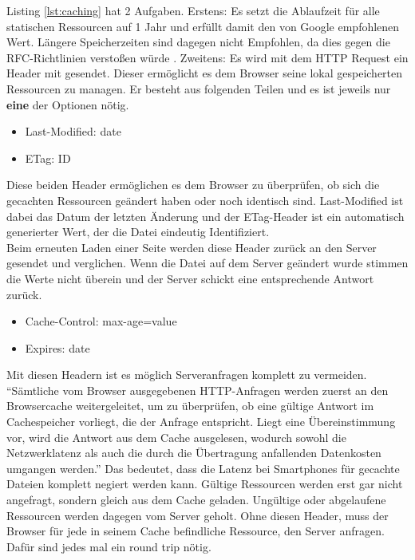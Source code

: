 			  Listing \ref{lst:caching} hat 2 Aufgaben. Erstens: Es setzt die Ablaufzeit für alle statischen Ressourcen auf 1 Jahr und erfüllt damit den von Google empfohlenen Wert. Längere Speicherzeiten sind dagegen nicht Empfohlen, da dies gegen die RFC-Richtlinien verstoßen würde \autocite{google14Caching}. Zweitens: Es wird mit dem HTTP Request ein Header mit gesendet. Dieser ermöglicht es dem Browser seine lokal gespeicherten Ressourcen zu managen. Er besteht aus folgenden Teilen und es ist jeweils nur \textbf{eine} der Optionen nötig.

			  \begin{itemize}
			  	\item Last-Modified: date
			  	\item ETag: ID
			  \end{itemize}

			  Diese beiden Header ermöglichen es dem Browser zu überprüfen, ob sich die gecachten Ressourcen geändert haben oder noch identisch sind. Last-Modified ist dabei das Datum der letzten Änderung und der ETag-Header ist ein automatisch generierter Wert, der die Datei eindeutig Identifiziert.\\
			  Beim erneuten Laden einer Seite werden diese Header zurück an den Server gesendet und verglichen. Wenn die Datei auf dem Server geändert wurde stimmen die Werte nicht überein und der Server schickt eine entsprechende Antwort zurück.

			  \begin{itemize}
			  	\item Cache-Control: max-age=value
			  	\item Expires: date
			  \end{itemize}

			  Mit diesen Headern ist es möglich Serveranfragen komplett zu vermeiden. "`Sämtliche vom Browser ausgegebenen HTTP-Anfragen werden zuerst an den Browsercache weitergeleitet, um zu überprüfen, ob eine gültige Antwort im Cachespeicher vorliegt, die der Anfrage entspricht. Liegt eine Übereinstimmung vor, wird die Antwort aus dem Cache ausgelesen, wodurch sowohl die Netzwerklatenz als auch die durch die Übertragung anfallenden Datenkosten umgangen werden."'\autocite{grigorikCaching} Das bedeutet, dass die Latenz bei Smartphones für gecachte Dateien komplett negiert werden kann. Gültige Ressourcen werden erst gar nicht angefragt, sondern gleich aus dem Cache geladen. Ungültige oder abgelaufene Ressourcen werden dagegen vom Server geholt. Ohne diesen Header, muss der Browser für jede in seinem Cache befindliche Ressource, den Server anfragen. Dafür sind jedes mal ein round trip nötig.\\

